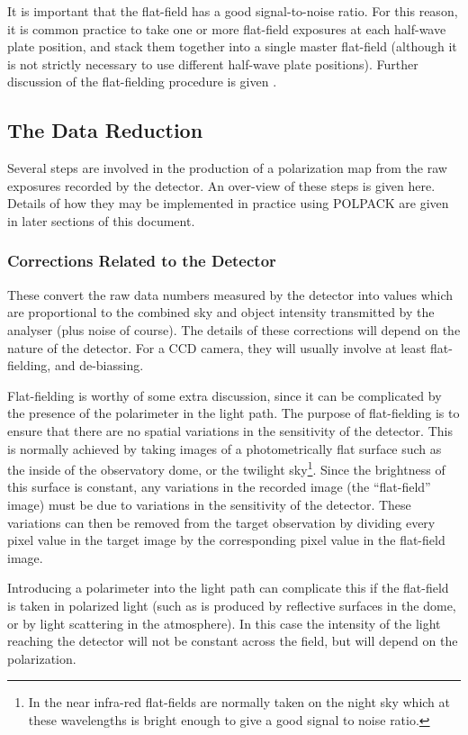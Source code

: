 \documentclass[twoside,11pt]{starlink}
\begin{document}
It is important that the flat-field has a good signal-to-noise ratio.
For this reason, it is common practice to take one or more flat-field
exposures at each half-wave plate position, and stack them together into a
single master flat-field (although it is not strictly necessary to use
different half-wave plate positions). Further discussion of the flat-fielding
procedure is given .

\subsection{\label{SEC:DBRED}The Data Reduction}
Several steps are involved in the production of a polarization map from
the raw exposures recorded by the detector. An over-view of these steps
is given here. Details of how they may be implemented in practice using
POLPACK are given in later sections of this document.

\subsubsection{\label{SEC:DETCOR}Corrections Related to the Detector}
These convert the raw data numbers measured by the detector into values
which are proportional to the combined sky and object intensity
transmitted by the analyser (plus noise of course). The details of these
corrections will depend on the nature of the detector. For a CCD camera,
they will usually involve at least flat-fielding, and de-biassing.

Flat-fielding is worthy of some extra discussion, since it can be
complicated by the presence of the polarimeter in the light path. The
purpose of flat-fielding is to ensure that there are no spatial
variations in the sensitivity of the detector. This is normally achieved
by taking images of a photometrically flat surface such as the inside of
the observatory dome, or the twilight sky\footnote{In the near infra-red
flat-fields are normally taken on the night sky which at these wavelengths
is bright enough to give a good signal to noise ratio.}. Since the
brightness of this surface is constant, any variations in the recorded
image (the ``flat-field'' image) must be due to variations in the
sensitivity of the detector. These variations can then be removed from the
target observation by dividing every pixel value in the target image by
the corresponding pixel value in the flat-field image.

Introducing a polarimeter into the light path can complicate this if the
flat-field is taken in polarized light (such as is produced by reflective
surfaces in the dome, or by light scattering in the atmosphere). In this
case the intensity of the light reaching the detector will not be
constant across the field, but will depend on the polarization.
\end{document}
